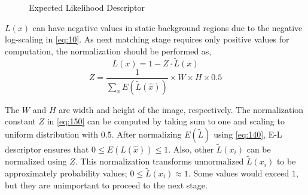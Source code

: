 \documentclass[conference]{IEEEtran}
\begin{document}
\begin{figure}[!t]
  \centering
  \label{fig:70}
  \hfill
  \hfill
  \caption{Expected Likelihood Descriptor}
\end{figure}
\begin{math} L(x) \end{math} can have negative values in static background regions due to the negative log-scaling in \ref{eq:10}. As next matching stage requires only positive values for computation, the normalization should be performed as,
\begin{equation}\label{eq:140}
  L(x) = 1 - Z \cdot \tilde{L}(x)
\end{equation}
\begin{equation}\label{eq:150}
  Z = \frac{1}{ \sum_x E( \tilde{L}(\hat{x}) ) } \times W \times H \times 0.5
\end{equation}

The \begin{math} W \end{math} and \begin{math} H \end{math} are width and height of the image, respectively. The normalization constant \begin{math} Z \end{math} in \ref{eq:150} can be computed by taking sum to one and scaling to uniform distribution with 0.5. After normalizing \begin{math} E(\tilde{L}) \end{math} using \ref{eq:140}, E-L descriptor ensures that \begin{math} 0 \le E( L(\hat{x})) \le 1 \end{math}. Also, other \begin{math} \tilde{L}( x_i ) \end{math}  can be normalized using \begin{math} Z \end{math}. This normalization transforms unnormalized \begin{math} \tilde{L}( x_i ) \end{math} to be approximately probability values; \begin{math} 0 \le \tilde{L}( x_i ) \approx 1 \end{math}. Some values would exceed \begin{math} 1 \end{math}, but they are unimportant to proceed to the next stage.
\end{document}
